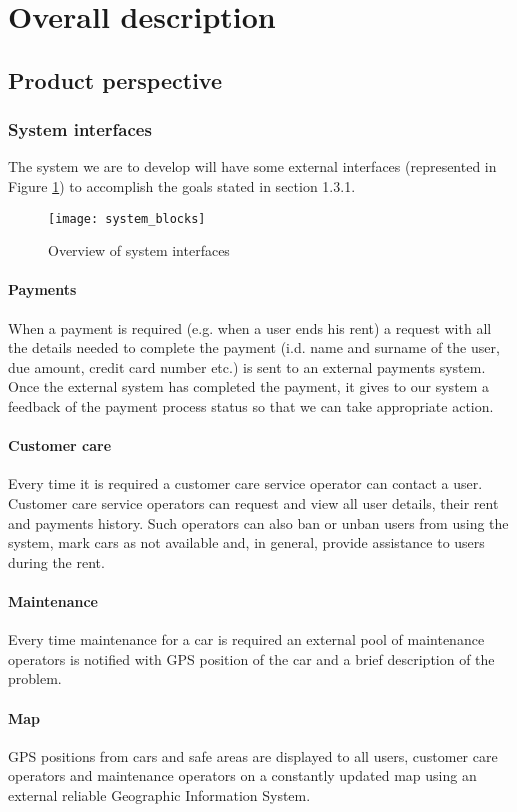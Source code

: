 \section{Overall description}
\subsection{Product perspective}
	\subsubsection{System interfaces}
		The system we are to develop will have some external interfaces (represented in Figure \ref{fig:systemInterfaces}) to accomplish the goals stated in section 1.3.1.
		\begin{figure}[h]
			\centering
			\texttt{[image: system\_blocks]}
			\caption{
				\label{fig:systemInterfaces} 
				Overview of system interfaces
			}
		\end{figure}
	\paragraph{Payments}
	When a payment is required (e.g. when a user ends his rent) a request with all the details needed to complete the payment (i.d. name and surname of the user, due amount, credit card number etc.) is sent to an external payments system. Once the external system has completed the payment, it gives to our system a feedback of the payment process status so that we can take appropriate action.
	
	\paragraph{Customer care} Every time it is required a customer care service operator can contact a user. Customer care service operators can request and view all user details, their rent and payments history. Such operators can also ban or unban users from using the system, mark cars as not available and, in general, provide assistance to users during the rent.

	\paragraph{Maintenance} Every time maintenance for a car is required an external pool of maintenance operators is notified with GPS position of the car and a brief description of the problem.

	\paragraph{Map} GPS positions from cars and safe areas are displayed to all users, customer care operators and maintenance operators on a constantly updated map using an external reliable Geographic Information System.
	
